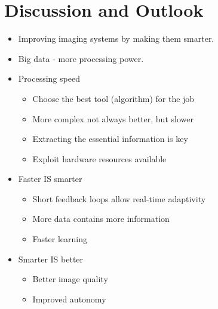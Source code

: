 \documentclass[thesis.tex]{subfiles}
\begin{document}
\chapter{Discussion and Outlook}

\begin{itemize}
\item Improving imaging systems by making them smarter.
\item Big data - more processing power.
\item Processing speed
\begin{itemize}
	\item Choose the best tool (algorithm) for the job
	\item More complex not always better, but slower
	\item Extracting the essential information is key 
	\item Exploit hardware resources available
\end{itemize}
\item Faster IS smarter
 \begin{itemize}
 	\item Short feedback loops allow real-time adaptivity
 	\item More data contains more information
 	\item Faster learning
 \end{itemize}
\item Smarter IS better
 \begin{itemize}
	\item Better image quality
	\item Improved autonomy
\end{itemize}
\end{itemize}
\end{document}
